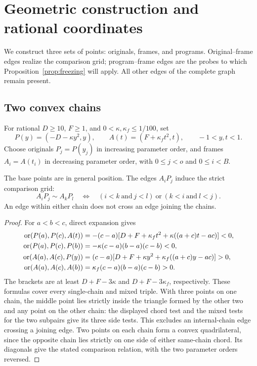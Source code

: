 \section{Geometric construction and rational coordinates}\label{sec:geometry}

We construct three sets of points: originals, frames, and programs. Original--frame edges realize the comparison grid; program--frame edges are the probes to which Proposition~\ref{prop:freezing} will apply. All other edges of the complete graph remain present.

\subsection{Two convex chains}
For rational $D\geq10$, $F\geq1$, and $0<\kappa,\kappa_f\leq1/100$, set
\begin{equation}\label{eq:caps}
 P(y)=(-D-\kappa y^2,y),\qquad A(t)=(F+\kappa_f t^2,t),\qquad -1<y,t<1.
\end{equation}
Choose originals $P_j=P(y_j)$ in increasing parameter order, and frames $A_i=A(t_i)$ in decreasing parameter order, with $0\leq j<o$ and $0\leq i<B$.

\begin{lemma}\label{lem:double-chain}
The base points are in general position. The edges $A_iP_j$ induce the strict comparison grid:
\[
A_iP_j\sim A_kP_l\quad\Longleftrightarrow\quad (i<k\ \text{and}\ j<l)\ \text{or}\ (k<i\ \text{and}\ l<j).
\]
An edge within either chain does not cross an edge joining the chains.
\end{lemma}
\begin{proof}
For $a<b<c$, direct expansion gives
\begin{align*}
\operatorname{or}(P(a),P(c),A(t))&=-(c-a)[D+F+\kappa_f t^2+\kappa((a+c)t-ac)]<0,\\
\operatorname{or}(P(a),P(c),P(b))&=-\kappa(c-a)(b-a)(c-b)<0,\\
\operatorname{or}(A(a),A(c),P(y))&=(c-a)[D+F+\kappa y^2+\kappa_f((a+c)y-ac)]>0,\\
\operatorname{or}(A(a),A(c),A(b))&=\kappa_f(c-a)(b-a)(c-b)>0.
\end{align*}
The brackets are at least $D+F-3\kappa$ and $D+F-3\kappa_f$, respectively. These formulas cover every single-chain and mixed triple. With three points on one chain, the middle point lies strictly inside the triangle formed by the other two and any point on the other chain: the displayed chord test and the mixed tests for the two subpairs give its three side tests. This excludes an internal-chain edge crossing a joining edge. Two points on each chain form a convex quadrilateral, since the opposite chain lies strictly on one side of either same-chain chord. Its diagonals give the stated comparison relation, with the two parameter orders reversed.
\end{proof}


